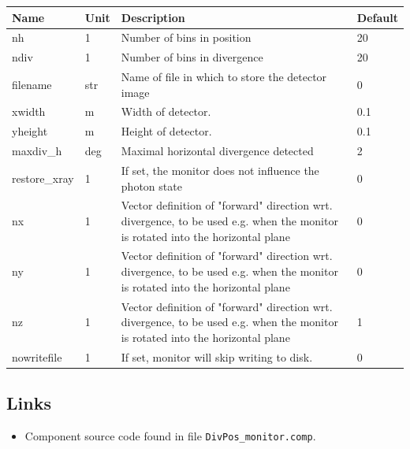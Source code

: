 \begin{longtable}{p{}p{}p{}p{}}
\toprule
\textbf{Name} & \textbf{Unit} & \textbf{Description} & \textbf{Default} \\
\midrule
\endhead
nh & 1 & Number of bins in position & 20 \\
ndiv & 1 & Number of bins in divergence & 20 \\
filename & str & Name of file in which to store the detector image & 0 \\
xwidth & m & Width of detector. & 0.1 \\
yheight & m & Height of detector. & 0.1 \\
maxdiv\_h & deg & Maximal horizontal divergence detected & 2 \\
restore\_xray & 1 & If set, the monitor does not influence the photon state & 0 \\
nx & 1 & Vector definition of "forward" direction wrt. divergence, to be used e.g. when the monitor is rotated into the horizontal plane & 0 \\
ny & 1 & Vector definition of "forward" direction wrt. divergence, to be used e.g. when the monitor is rotated into the horizontal plane & 0 \\
nz & 1 & Vector definition of "forward" direction wrt. divergence, to be used e.g. when the monitor is rotated into the horizontal plane & 1 \\
nowritefile & 1 & If set, monitor will skip writing to disk. & 0 \\
\bottomrule
\end{longtable}

\subsection*{Links}
\begin{itemize}
  \item Component source code found in file \texttt{DivPos\_monitor.comp}.
\end{itemize}
